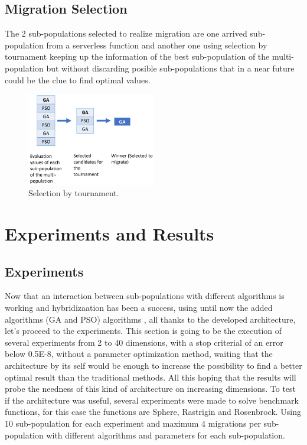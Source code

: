 \documentclass[runningheads]{llncs}
\begin{document}
  \subsection{Migration Selection} The 2 sub-populations selected to realize migration are one arrived sub-population from a serverless function and another one 
  using selection by tournament keeping up the information of the best
  sub-population of the multi-population but without discarding posible sub-populations that in a near future could be the clue to find optimal values.

\begin{figure}[htp]
  \centering
  \includegraphics[width=0.5\textwidth]{img/selection.png}
  \caption{Selection by tournament.} \label{fig5}
  \end{figure}


\section{Experiments and Results}
\subsection{Experiments}
Now that an interaction between sub-populations with different algorithms is
working and  hybridizaation has been a success, using until now the added
algorithms (GA and PSO) algorithms \cite{Kramer2017,Guerrero2017,Lalwani2019}, all thanks to the developed architecture,
let's proceed to the experiments. This section is going to be the execution of
several experiments from 2 to 40 dimensions, with a stop criterial of an error
below  0.5E-8, without a parameter optimization method, waiting that the
architecture by its self would be enough to increase the possibility to find a
better optimal result than the traditional methods. All this hoping that the
results will probe the needness of this kind of architecture on increasing
dimensions. To test if the architecture was useful, several experiments were
made to solve benchmark functions, for this case the functions are Sphere,
Rastrigin and Rosenbrock. Using 10 sub-population for each experiment and
maximum 4 migrations per sub-population with different algorithms and parameters
for each sub-population.
\end{document}
